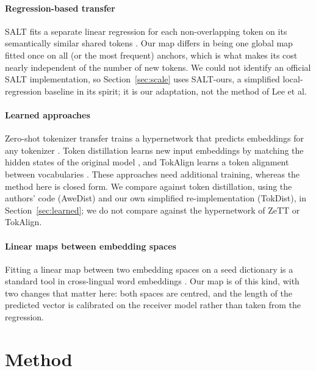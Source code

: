 \documentclass[preprint,12pt]{elsarticle}
\begin{document}
\paragraph{Regression-based transfer}SALT fits a separate linear regression for each non-overlapping token on its semantically similar shared tokens \cite{lee2025salt}. Our map differs in being one global map fitted once on all (or the most frequent) anchors, which is what makes its cost nearly independent of the number of new tokens. We could not identify an official SALT implementation, so Section~\ref{sec:scale} uses SALT-ours, a simplified local-regression baseline in its spirit; it is our adaptation, not the method of Lee et al.\par\paragraph{Learned approaches} Zero-shot tokenizer transfer trains a hypernetwork that predicts embeddings for any tokenizer \cite{minixhofer2024zett}. Token distillation learns new input embeddings by matching the hidden states of the original model \cite{dobler2025tokendistillation}, and TokAlign learns a token alignment between vocabularies \cite{li2025tokalign}. These approaches need additional training, whereas the method here is closed form. We compare against token distillation, using the authors' code (AweDist) and our own simplified re-implementation (TokDist), in Section~\ref{sec:learned}; we do not compare against the hypernetwork of ZeTT or TokAlign.

\paragraph{Linear maps between embedding spaces} Fitting a linear map between two embedding spaces on a seed dictionary is a standard tool in cross-lingual word embeddings \cite{mikolov2013exploiting}. Our map is of this kind, with two changes that matter here: both spaces are centred, and the length of the predicted vector is calibrated on the receiver model rather than taken from the regression.

\section{Method}
\label{sec:method}
\end{document}
